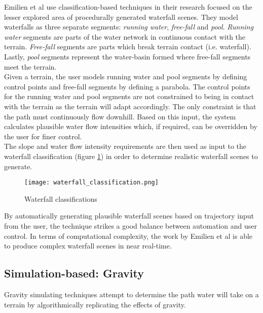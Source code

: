 Emilien et al \cite{Emilien2014} use classification-based techniques in their research focused on the lesser explored area of procedurally generated waterfall scenes. They model waterfalls as three separate segments: \textit{running water}, \textit{free-fall} and \textit{pool}. \textit{Running water} segments are parts of the water network in continuous contact with the terrain. \textit{Free-fall} segments are parts which break terrain contact (i.e. waterfall). Lastly, \textit{pool} segments represent the water-basin formed where free-fall segments meet the terrain. \\
Given a terrain, the user models running water and pool segments by defining control points and free-fall segments by defining a parabola. The control points for the running water and pool segments are not constrained to being in contact with the terrain as the terrain will adapt accordingly. The only constraint is that the path must continuously flow downhill. Based on this input, the system calculates plausible water flow intensities which, if required, can be overridden by the user for finer control.\\
The slope and water flow intensity requirements are then used as input to the waterfall classification (figure \ref{fig:waterfall_classification}) in order to determine realistic waterfall scenes to generate.\\

\begin{figure}[h]
  \centering
	\texttt{[image: waterfall\_classification.png]}
	\caption{Waterfall classifications \cite{Emilien2014}}
	\label{fig:waterfall_classification}
\end{figure}

By automatically generating plausible waterfall scenes based on trajectory input from the user, the technique strikes a good balance between automation and user control. In terms of computational complexity, the work by Emilien et al \cite{Emilien2014} is able to produce complex waterfall scenes in near real-time.

\subsection{Simulation-based: Gravity} \label{subsec:gravitation}

Gravity simulating techniques attempt to determine the path water will take on a terrain by algorithmically replicating the effects of gravity. \\

